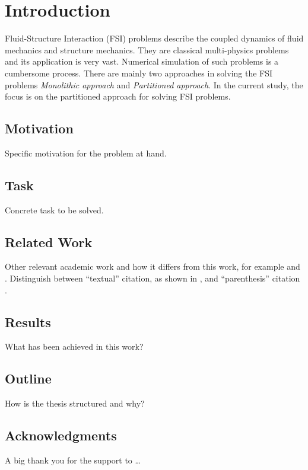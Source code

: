 %
% 


\chapter{Introduction}
Fluid-Structure Interaction (FSI) problems describe the coupled dynamics of fluid mechanics and structure mechanics. They are classical multi-physics problems and its application is very vast. Numerical simulation of such problems is a cumbersome process. There are mainly two approaches in solving the FSI problems \textit{Monolithic approach} and \textit{Partitioned approach}. In the current study, the focus is on the partitioned approach for solving FSI problems.
 


\section{Motivation}

Specific motivation for the problem at hand. 


\section{Task}

Concrete task to be solved. 



\section{Related Work}

Other relevant academic work and how it differs from this work, for
example \citet{shannon_diff} and \citet{blowfish}. Distinguish between
``textual'' citation, as shown in \citet{shannon_diff}, and
``parenthesis'' citation \citep{blowfish}.



\section{Results}

What has been achieved in this work? 


\section{Outline}

How is the thesis structured and why? 


\section{Acknowledgments}

A big thank you for the support to \ldots 

